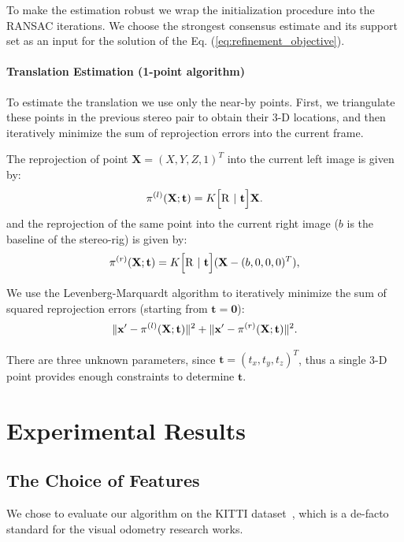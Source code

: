 \documentclass{report}
\DeclarePairedDelimiter{\norm}{\lVert}{\rVert}
\begin{document}
To make the estimation robust we wrap the initialization procedure
into the RANSAC iterations.  We choose the strongest consensus
estimate and its support set as an input for the solution of the
Eq. (\ref{eq:refinement_objective}).

\paragraph{Translation Estimation (1-point
  algorithm)}\label{sec:stereo_trans} To estimate
the translation we use only the near-by points.  First, we triangulate
these points in the previous stereo pair to obtain their 3-D
locations, and then iteratively minimize the sum of reprojection
errors into the current frame.

The reprojection of point $\mathbf{X}=(X,Y,Z,1)^T$ into the current
left image is given by:
\begin{equation}
  \pi^{(l)}(\mathbf{X};\mathbf{t}) =  K\Bigl[ \mathrm{R}\ |\ \mathbf{t} \Bigr]\mathbf{X}.
\end{equation}
and the reprojection of the same point into the current right image
($b$ is the baseline of the stereo-rig) is given by:
\begin{equation}
  \pi^{(r)}(\mathbf{X};\mathbf{t}) =  K\Bigl[ \mathrm{R}\ |\ \mathbf{t} \Bigr](\mathbf{X} - (b,0,0,0)^T),
\end{equation}

We use the Levenberg-Marquardt algorithm to iteratively minimize the
sum of squared reprojection errors (starting from
$\mathbf{t}=\mathbf{0}$):
\begin{equation}
\norm{\mathbf{x'} - \pi^{(l)}(\mathbf{X};\mathbf{t})}^2 + \norm{\mathbf{x'} - \pi^{(r)}(\mathbf{X};\mathbf{t})}^2.
\end{equation}

There are three unknown parameters, since
$\mathbf{t} = (t_x,t_y,t_z)^T$, thus a single 3-D point provides
enough constraints to determine $\mathbf{t}$.

\section{Experimental Results}\label{sec:results}

\subsection{The Choice of Features}
We chose to evaluate our algorithm on the KITTI
dataset~\cite{Geiger2012}, which is a de-facto standard for the
visual odometry research works.
\end{document}

